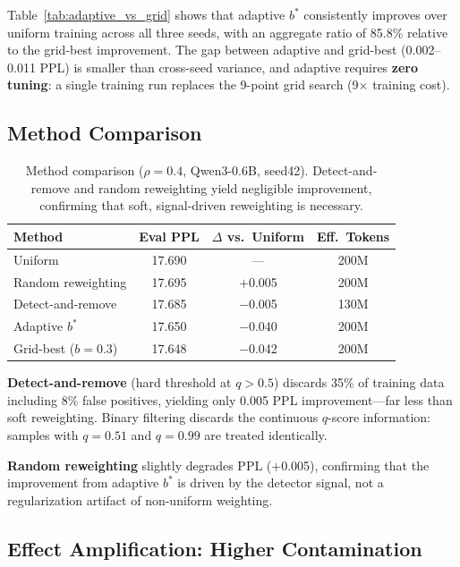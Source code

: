 \documentclass[11pt,a4paper]{article}
\newcommand{\bstar}{b^{*}}
\begin{document}
Table~\ref{tab:adaptive_vs_grid} shows that adaptive $\bstar$ consistently improves over uniform training across all three seeds, with an aggregate ratio of 85.8\% relative to the grid-best improvement.
The gap between adaptive and grid-best (0.002--0.011 PPL) is smaller than cross-seed variance, and adaptive requires \textbf{zero tuning}: a single training run replaces the 9-point grid search (9$\times$ training cost).

\subsection{Method Comparison}
\label{sec:method_comparison}

\begin{table}[t]
\centering
\small
\caption{Method comparison ($\rho{=}0.4$, Qwen3-0.6B, seed42). Detect-and-remove and random reweighting yield negligible improvement, confirming that soft, signal-driven reweighting is necessary.}
\label{tab:method_comparison}
\begin{tabular}{lccc}
\toprule
Method & Eval PPL & $\Delta$ vs.\ Uniform & Eff.\ Tokens \\
\midrule
Uniform & 17.690 & --- & 200M \\
Random reweighting & 17.695 & $+$0.005 & 200M \\
Detect-and-remove & 17.685 & $-$0.005 & 130M \\
Adaptive $\bstar$ & 17.650 & $-$0.040 & 200M \\
Grid-best ($b{=}0.3$) & 17.648 & $-$0.042 & 200M \\
\bottomrule
\end{tabular}
\end{table}

\textbf{Detect-and-remove} (hard threshold at $q > 0.5$) discards 35\% of training data including 8\% false positives, yielding only 0.005 PPL improvement---far less than soft reweighting.
Binary filtering discards the continuous $q$-score information: samples with $q = 0.51$ and $q = 0.99$ are treated identically.

\textbf{Random reweighting} slightly degrades PPL ($+$0.005), confirming that the improvement from adaptive $\bstar$ is driven by the detector signal, not a regularization artifact of non-uniform weighting.

\subsection{Effect Amplification: Higher Contamination}
\label{sec:rho06}
\end{document}
